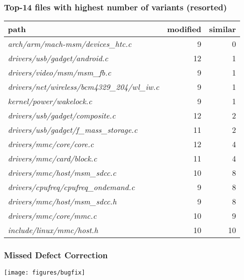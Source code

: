 \documentclass[11pt]{beamer}
\begin{document}
\begin{frame}[fragile]
\frametitle{Top-14 files with highest number of variants (resorted)}

\begin{tabular}{|l|r|r|}
\hline
path & modified & similar \\
\hline
\textit{arch/arm/mach-msm/devices\_htc.c} & 9 & 0\\
\textit{drivers/usb/gadget/android.c} & 12 & 1\\
\textit{drivers/video/msm/msm\_fb.c}  & 9 & 1\\
\textit{drivers/net/wireless/bcm4329\_204/wl\_iw.c} & 9 & 1\\
\textit{kernel/power/wakelock.c} & 9 & 1\\
\textit{drivers/usb/gadget/composite.c} & 12 & 2\\
\textit{drivers/usb/gadget/f\_mass\_storage.c} & 11 & 2\\
\textit{drivers/mmc/core/core.c} & 12 & 4\\
\textit{drivers/mmc/card/block.c} & 11 & 4\\
\textit{drivers/mmc/host/msm\_sdcc.c} & 10 & 8\\
\textit{drivers/cpufreq/cpufreq\_ondemand.c}  & 9 & 8\\
\textit{drivers/mmc/host/msm\_sdcc.h} & 9 & 8\\
\textit{drivers/mmc/core/mmc.c} & 10 & 9\\
\textit{include/linux/mmc/host.h} & 10 & 10\\
\hline
\end{tabular}
\end{frame}

\begin{frame}
\frametitle{Missed Defect Correction}

  \begin{center}
    \texttt{[image: figures/bugfix]}
  \end{center}


\end{frame}
\end{document}
